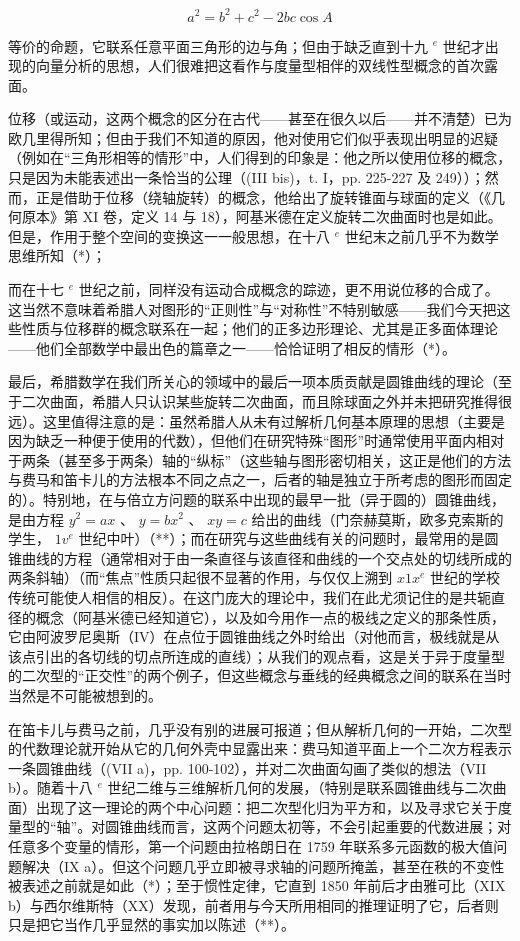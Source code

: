 \[
a ^ {2} = b ^ {2} + c ^ {2} - 2 b c \cos A
\]

等价的命题，它联系任意平面三角形的边与角；但由于缺乏直到十九 \(^{e}\) 世纪才出现的向量分析的思想，人们很难把这看作与度量型相伴的双线性型概念的首次露面。

位移（或运动，这两个概念的区分在古代——甚至在很久以后——并不清楚）已为欧几里得所知；但由于我们不知道的原因，他对使用它们似乎表现出明显的迟疑（例如在“三角形相等的情形”中，人们得到的印象是：他之所以使用位移的概念，只是因为未能表述出一条恰当的公理（(III bis)，t. I，pp. 225-227 及 249））；然而，正是借助于位移（绕轴旋转）的概念，他给出了旋转锥面与球面的定义（《几何原本》第 XI 卷，定义 14 与 18），阿基米德在定义旋转二次曲面时也是如此。但是，作用于整个空间的变换这一一般思想，在十八 \(^{e}\) 世纪末之前几乎不为数学思维所知（*）；

而在十七 \(^{e}\) 世纪之前，同样没有运动合成概念的踪迹，更不用说位移的合成了。这当然不意味着希腊人对图形的“正则性”与“对称性”不特别敏感——我们今天把这些性质与位移群的概念联系在一起；他们的正多边形理论、尤其是正多面体理论——他们全部数学中最出色的篇章之一——恰恰证明了相反的情形（*）。

最后，希腊数学在我们所关心的领域中的最后一项本质贡献是圆锥曲线的理论（至于二次曲面，希腊人只认识某些旋转二次曲面，而且除球面之外并未把研究推得很远）。这里值得注意的是：虽然希腊人从未有过解析几何基本原理的思想（主要是因为缺乏一种便于使用的代数），但他们在研究特殊“图形”时通常使用平面内相对于两条（甚至多于两条）轴的“纵标”（这些轴与图形密切相关，这正是他们的方法与费马和笛卡儿的方法根本不同之点之一，后者的轴是独立于所考虑的图形而固定的）。特别地，在与倍立方问题的联系中出现的最早一批（异于圆的）圆锥曲线，是由方程 \(y^{2} = ax\) 、 \(y = bx^{2}\) 、 \(xy = c\) 给出的曲线（门奈赫莫斯，欧多克索斯的学生， \(1v^{e}\) 世纪中叶）（**）；而在研究与这些曲线有关的问题时，最常用的是圆锥曲线的方程（通常相对于由一条直径与该直径和曲线的一个交点处的切线所成的两条斜轴）（而“焦点”性质只起很不显著的作用，与仅仅上溯到 \(x1x^{e}\) 世纪的学校传统可能使人相信的相反）。在这门庞大的理论中，我们在此尤须记住的是共轭直径的概念（阿基米德已经知道它），以及如今用作一点的极线之定义的那条性质，它由阿波罗尼奥斯（IV）在点位于圆锥曲线之外时给出（对他而言，极线就是从该点引出的各切线的切点所连成的直线）；从我们的观点看，这是关于异于度量型的二次型的“正交性”的两个例子，但这些概念与垂线的经典概念之间的联系在当时当然是不可能被想到的。

在笛卡儿与费马之前，几乎没有别的进展可报道；但从解析几何的一开始，二次型的代数理论就开始从它的几何外壳中显露出来：费马知道平面上一个二次方程表示一条圆锥曲线（(VII a)，pp. 100-102），并对二次曲面勾画了类似的想法（VII b）。随着十八 \(^{e}\) 世纪二维与三维解析几何的发展，（特别是联系圆锥曲线与二次曲面）出现了这一理论的两个中心问题：把二次型化归为平方和，以及寻求它关于度量型的“轴”。对圆锥曲线而言，这两个问题太初等，不会引起重要的代数进展；对任意多个变量的情形，第一个问题由拉格朗日在 1759 年联系多元函数的极大值问题解决（IX a）。但这个问题几乎立即被寻求轴的问题所掩盖，甚至在秩的不变性被表述之前就是如此（*）；至于惯性定律，它直到 1850 年前后才由雅可比（XIX b）与西尔维斯特（XX）发现，前者用与今天所用相同的推理证明了它，后者则只是把它当作几乎显然的事实加以陈述（**）。

